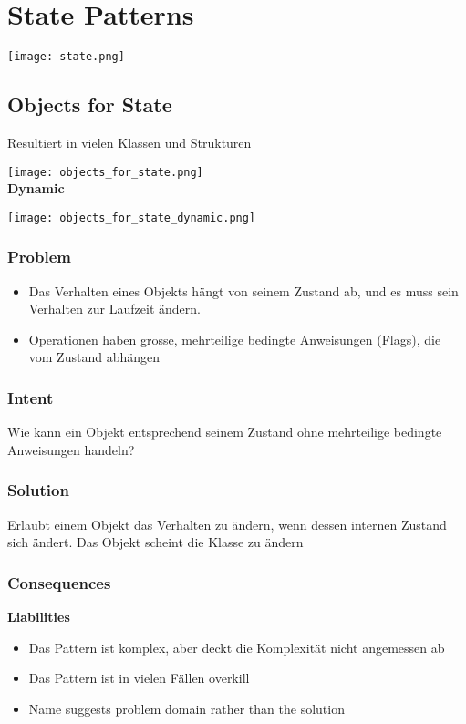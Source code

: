 \section{State Patterns}

\texttt{[image: state.png]}

\subsection{Objects for State}

Resultiert in vielen Klassen und Strukturen

\texttt{[image: objects\_for\_state.png]} \\

\textbf{Dynamic}

\texttt{[image: objects\_for\_state\_dynamic.png]}

\subsubsection{Problem}
\begin{itemize}
    \item Das Verhalten eines Objekts hängt von seinem Zustand ab, und es muss sein Verhalten zur Laufzeit ändern.
    \item Operationen haben grosse, mehrteilige bedingte Anweisungen (Flags), die vom Zustand abhängen
\end{itemize}
\subsubsection{Intent}
Wie kann ein Objekt entsprechend seinem Zustand ohne mehrteilige bedingte Anweisungen handeln?

\subsubsection{Solution}

Erlaubt einem Objekt das Verhalten zu ändern, wenn dessen internen Zustand sich ändert. Das Objekt scheint die Klasse zu ändern

\subsubsection{Consequences}
\textbf{Liabilities}
\begin{itemize}
    \item Das Pattern ist komplex, aber deckt die Komplexität nicht angemessen ab
    \item Das Pattern ist in vielen Fällen overkill
    \item Name suggests problem domain rather than the solution
\end{itemize}

